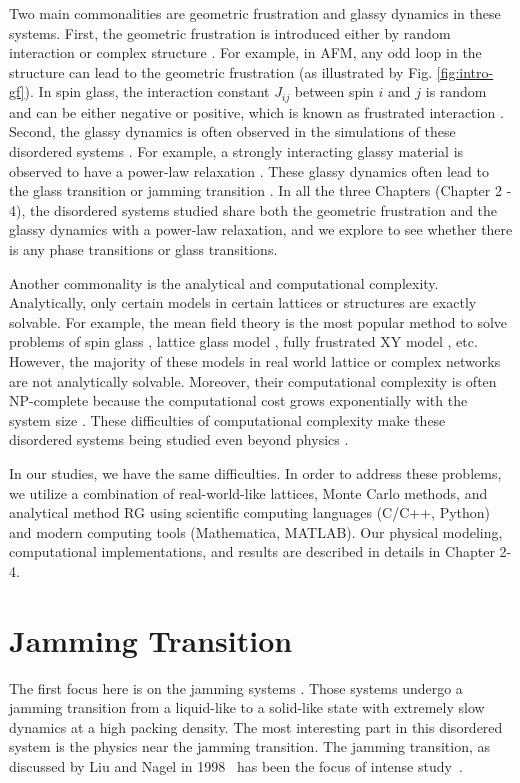 Two main commonalities are geometric frustration and glassy dynamics  in these systems. First, the geometric frustration is introduced either by random interaction or complex structure \cite{vannimenus1977}. For example, in AFM, any odd loop in the structure can lead to the geometric frustration \cite{wannier1950afm} (as illustrated by Fig. \ref{fig:intro-gf}). In spin glass, the interaction constant $J_{ij}$ between spin $i$ and $j$ is random and can be either negative or positive, which is known as frustrated interaction \cite{edwards1975theory}.
Second, the glassy dynamics is often observed in the simulations of these disordered systems \cite{lunkenheimer2000}. For example, a strongly interacting glassy material is observed to have a power-law relaxation \cite{palmer1984}. These glassy dynamics often lead to the glass transition \cite{biroli2013perspective} or jamming transition \cite{Liu1998}. 
In all the three Chapters (Chapter 2 - 4), the disordered systems studied share both the geometric frustration and the glassy dynamics with a power-law relaxation, and we explore to see whether there is any phase transitions or glass transitions.

Another commonality is the analytical and computational complexity. Analytically, only certain models in certain lattices or structures are exactly solvable. For example, the mean field theory  \cite{kadanoff2009} is the most popular method to solve problems of spin glass \cite{sherrington1975}, lattice glass model \cite{Biroli02}, fully frustrated XY model \cite{kim2001xy}, etc. However, the majority of these models in real world lattice or complex networks are not analytically solvable. Moreover, their computational complexity is often NP-complete \cite{garey1983} because the computational cost grows exponentially with the system size \cite{barahona1982, weigt2000}. These difficulties of computational complexity make these disordered systems being studied even beyond physics \cite{mezard1990spin, stein2013spin}.

In our studies, we have the same difficulties. In order to address these problems, we utilize a combination \cite{cheng2015jamming, ma2016prb} of real-world-like lattices, Monte Carlo methods, and analytical method RG using scientific computing languages (C/C++, Python) and modern computing tools (Mathematica, MATLAB). Our physical modeling, computational implementations, and results are described in details in Chapter 2-4.


\section{Jamming Transition}
\label{sec:jam_intro}
The first focus here is on the jamming systems \cite{Biroli2007}. Those systems undergo 
a jamming transition from a liquid-like to a solid-like state with extremely slow 
dynamics at a high packing density. The most interesting part in this 
disordered system is the physics near the jamming transition. 
The jamming transition, as discussed by Liu and
Nagel in 1998~\cite{Liu1998} has been the focus of
intense study~\cite{Biroli2007,Liu2010,Berthier2011}. 

